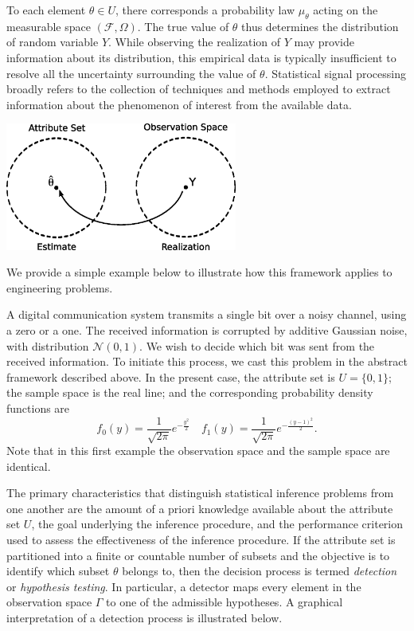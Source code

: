 To each element $\theta \in U$, there corresponds a probability law $\mu_{\theta}$ acting on the measurable space $(\mathcal{F}, \Omega)$.
The true value of $\theta$ thus determines the distribution of random variable $Y$.
While observing the realization of $Y$ may provide information about its distribution, this empirical data is typically insufficient to resolve all the uncertainty surrounding the value of $\theta$.
Statistical signal processing broadly refers to the collection of techniques and methods employed to extract information about the phenomenon of interest from the available data.

\begin{center}
\includegraphics[width=3in]{Figures/1Chapter/StatisticalSignalProcessing}
\end{center}

We provide a simple example below to illustrate how this framework applies to engineering problems.

\begin{example} \label{example:BinaryCommunicationSystem}
A digital communication system transmits a single bit over a noisy channel, using a zero or a one.
The received information is corrupted by additive Gaussian noise, with distribution $\mathcal{N}(0,1)$.
We wish to decide which bit was sent from the received information.
To initiate this process, we cast this problem in the abstract framework described above.
In the present case, the attribute set is $U = \{ 0, 1 \}$; the sample space is the real line; and the corresponding probability density functions are
\begin{equation*}
f_0 (y) = \frac{1}{\sqrt{2 \pi}} e^{- \frac{y^2}{2}} \quad
f_1 (y) = \frac{1}{\sqrt{2 \pi}} e^{- \frac{(y-1)^2}{2}} .
\end{equation*}
Note that in this first example the observation space and the sample space are identical.
\end{example}

The primary characteristics that distinguish statistical inference problems from one another are the amount of a priori knowledge available about the attribute set $U$, the goal underlying the inference procedure, and the performance criterion used to assess the effectiveness of the inference procedure.
If the attribute set is partitioned into a finite or countable number of subsets and the objective is to identify which subset $\theta$ belongs to, then the decision process is termed \emph{detection} or \emph{hypothesis testing}.
In particular, a detector maps every element in the observation space $\Gamma$ to one of the admissible hypotheses.
A graphical interpretation of a detection process is illustrated below.

